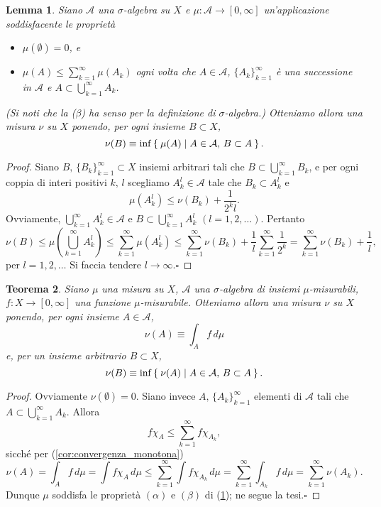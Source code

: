 \documentclass[a4paper,10pt,openright,oneside]{book}
\theoremstyle{theoremstyle}
\newtheorem{teorema}{Teorema}[section]
\newtheorem{lemma}[teorema]{Lemma}
\theoremstyle{theoremstylewoheader}
\theoremstyle{theoremstyle}
\theoremstyle{proofsecstyle}
\theoremstyle{nonumberplain}
\newtheorem{proof}{Dim.}
\renewcommand{\AA}{\ensuremath{\mathcal{A}}}
\renewcommand{\qedsymbol}{\ensuremath{\square}}
\newcommand{\qed}{\unskip\nobreak\hfill\nobreak\hspace{.5em}\qedsymbol}
\begin{document}
\begin{lemma}
\label{lem:estensione_di_una_misura}
Siano $\AA$ una $\sigma$-algebra su $X$ e $\mu : \AA \rightarrow [0, \infty]$ un'applicazione soddisfacente le proprietà
\begin{itemize}
\item[($\alpha$)] $\mu(\emptyset) = 0$, e
\item[($\beta$)] $\mu(A) \le \sum_{k=1}^{\infty} \mu(A_k)$ ogni volta che $A \in \AA$, $\{A_k\}_{k=1}^\infty$ è una successione in $\AA$ e $A \subset \bigcup_{k=1}^{\infty} A_k$.
\end{itemize}
(Si noti che la ($\beta$) ha senso per la definizione di $\sigma$-algebra.) Otteniamo allora una misura $\nu$ su $X$ ponendo, per ogni insieme $B \subset X$,
\[
\nu(B) \equiv \inf\Set{ \mu(A) | A \in \AA,\, B \subset A }. 
\]
\end{lemma}

\begin{proof}
Siano $B,\, \{B_k\}_{k=1}^\infty \subset X$ insiemi arbitrari tali che $B \subset \bigcup_{k=1}^\infty B_k$, e per ogni coppia di interi positivi $k,\, l$ scegliamo $A_k^l \in \AA$ tale che $B_k \subset A_k^l$ e
\[
\mu(A_k^l) \le \nu(B_k) + \frac{1}{2^k l}.
\]
Ovviamente, $\bigcup_{k=1}^\infty A_k^l \in \AA$ e $B \subset \bigcup_{k=1}^\infty A_k^l$ $(l = 1, 2, \ldots)$. Pertanto
\[
\nu(B) \le \mu\left(\bigcup_{k=1}^\infty A_k^l\right) \le \sum_{k=1}^\infty \mu(A_k^l) \le \sum_{k=1}^\infty \nu(B_k) + \frac{1}{l}\sum_{k=1}^\infty \frac{1}{2^k} = \sum_{k=1}^\infty \nu(B_k) + \frac{1}{l},
\] 
per $l = 1, 2, \ldots$ Si faccia tendere $l \to \infty$.\qed
\end{proof}

\begin{teorema}
\label{thm:misura_da_integrale}
Siano $\mu$ una misura su $X$, $\AA$ una $\sigma$-algebra di insiemi $\mu$-misurabili, $f : X \rightarrow [0, \infty]$ una funzione $\mu$-misurabile. Otteniamo allora una misura $\nu$ su $X$ ponendo, per ogni insieme $A \in \AA$,
\[
\nu(A) \equiv \int_A f\, d\mu
\]
e, per un insieme arbitrario $B \subset X$,
\[
\nu(B) \equiv \inf\Set{ \nu(A) | A \in \AA,\, B \subset A }.
\]
\end{teorema}

\begin{proof}
Ovviamente $\nu(\emptyset) = 0$. Siano invece $A,\, \{A_k\}_{k=1}^\infty$ elementi di $\AA$ tali che $A \subset \bigcup_{k=1}^\infty A_k$. Allora
\[
f\chi_A \le \sum_{k=1}^\infty f\chi_{A_k},
\]
sicché per (\ref{cor:convergenza_monotona})
\[
\nu(A) = \int_A f\, d\mu = \int f\chi_A\, d\mu \le \sum_{k=1}^\infty \int f\chi_{A_k}\, d\mu = \sum_{k=1}^\infty \int_{A_k} f\, d\mu = \sum_{k=1}^\infty \nu(A_k).
\]
Dunque $\mu$ soddisfa le proprietà $(\alpha)$ e $(\beta)$ di (\ref{lem:estensione_di_una_misura}); ne segue la tesi.\qed
\end{proof}
\end{document}
